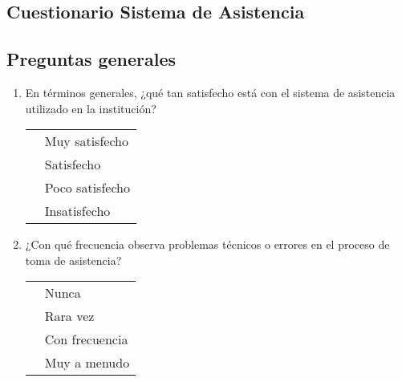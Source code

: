 \documentclass[12pt, a4paper]{article}
\newcommand{\checkbox}{\fbox{\rule{0pt}{1.5ex}\rule{1.5ex}{0pt}}}
\begin{document}
                                                                \subsection{Cuestionario Sistema de Asistencia}

                                                                \subsection*{Preguntas generales}

                                                                \begin{enumerate}[label=\textbf{G\arabic*}.]
                                                                \item En términos generales, ¿qué tan satisfecho está con el sistema de asistencia utilizado en la institución?\\
                                                                    \begin{tabular}{ll}
                                                                    \checkbox & Muy satisfecho \\
                                                                        \checkbox & Satisfecho \\
                                                                        \checkbox & Poco satisfecho \\
                                                                        \checkbox & Insatisfecho \\
                                                                        \end{tabular}

                                                                        \item ¿Con qué frecuencia observa problemas técnicos o errores en el proceso de toma de asistencia?\\
                                                                            \begin{tabular}{ll}
                                                                            \checkbox & Nunca \\
                                                                                \checkbox & Rara vez \\
                                                                                \checkbox & Con frecuencia \\
                                                                                \checkbox & Muy a menudo \\
                                                                                \end{tabular}
                                                                                \end{enumerate}
\end{document}
